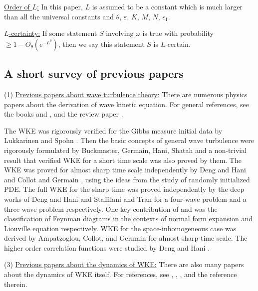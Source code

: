 \underline{Order of $L$:} In this paper, $L$ is assumed to be a constant which is much larger than all the universal constants and $\theta$, $\varepsilon$, $K$, $M$, $N$, $\epsilon_1$. 

\underline{$L$-certainty:} If some statement $S$ involving $\omega$ is true with probability $\geq 1-O_{\theta}(e^{-L^\theta})$, then we say this statement $S$ is $L$-certain.


\subsection{A short survey of previous papers} 
(1) \underline{Previous papers about wave turbulence theory:} There are numerous physics papers about the derivation of wave kinetic equation. For general references, see the books \cite{zakharov2012kolmogorov} and \cite{nazarenko2011wave}, and the review paper \cite{newell2011wave}. 


The WKE was rigorously verified for the Gibbs measure initial data by Lukkarinen and Spohn \cite{lukkarinen2011weakly}. Then the basic concepts of general wave turbulence were rigorously formulated by Buckmaster, Germain, Hani, Shatah \cite{buckmaster2021onset} and a non-trivial result that verified WKE for a short time scale was also proved by them. The WKE was proved for almost sharp time scale independently by Deng and Hani \cite{deng2021derivation} and Collot and Germain \cite{collot2019derivation}, \cite{collot2020derivation} using the ideas from the study of randomly initialized PDE. The full WKE for the sharp time was proved independently by the deep works of Deng and Hani \cite{deng2021full} and Staffilani and Tran \cite{staffilani2021wave} for a four-wave problem and a three-wave problem respectively. One key contribution of \cite{deng2021full} and \cite{staffilani2021wave} was the classification of Feynman diagrams in the contexts of normal form expansion and Liouville equation respectively. WKE for the space-inhomogeneous case was derived by Ampatzoglou, Collot, and Germain \cite{ampatzoglou2021derivation} for almost sharp time scale. The higher order correlation functions were studied by Deng and Hani \cite{deng2021propagation}.  

(3) \underline{Previous papers about the dynamics of WKE:} There are also many papers about the dynamics of WKE itself. For references, see \cite{germain2020optimal}, \cite{gamba2020wave}, \cite{soffer2018dynamics}, \cite{soffer2020energy} and the reference therein.












